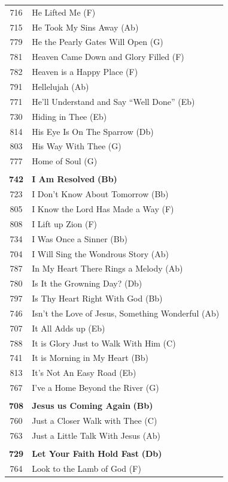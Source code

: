 \begin{supertabular}{c l}
716 & He Lifted Me (F) \\
715 & He Took My Sins Away (Ab) \\
779 & He the Pearly Gates Will Open (G) \\
781 & Heaven Came Down and Glory Filled (F) \\
782 & Heaven is a Happy Place (F) \\
791 & Hellelujah (Ab) \\
771 & He’ll Understand and Say “Well Done” (Eb) \\
730 & Hiding in Thee (Eb) \\
814 & His Eye Is On The Sparrow (Db) \\
803 & His Way With Thee (G) \\
777 & Home of Soul (G) \\
 & \\
\textbf{742} & \textbf{I Am Resolved} \textbf{(Bb)} \\
723 & I Don’t Know About Tomorrow (Bb) \\
805 & I Know the Lord Has Made a Way (F) \\
808 & I Lift up Zion (F) \\
734 & I Was Once a Sinner (Bb) \\
704 & I Will Sing the Wondrous Story (Ab) \\
787 & In My Heart There Rings a Melody (Ab) \\
780 & Is It the Growning Day? (Db) \\
797 & Is Thy Heart Right With God (Bb) \\
746 & Isn’t the Love of Jesus, Something Wonderful (Ab) \\
707 & It All Adds up (Eb) \\
788 & It is Glory Just to Walk With Him (C) \\
741 & It is Morning in My Heart (Bb) \\
813 & It’s Not An Easy Road (Eb) \\
767 & I’ve a Home Beyond the River (G) \\
 & \\
\textbf{708} & \textbf{Jesus us Coming Again} \textbf{(Bb)} \\
760 & Just a Closer Walk with Thee (C) \\
763 & Just a Little Talk With Jesus (Ab) \\
 & \\
\textbf{729} & \textbf{Let Your Faith Hold Fast} \textbf{(Db)} \\
764 & Look to the Lamb of God (F) \\

\end{supertabular}
